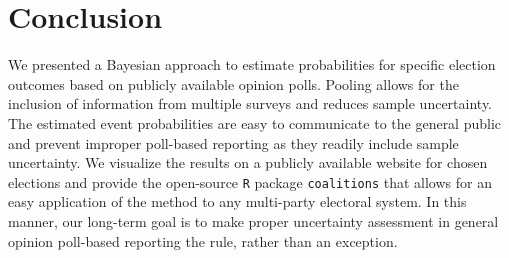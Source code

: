 \documentclass[smallcondensed]{svjour3}     %
\begin{document}
\section{Conclusion} \label{sec:conclusion}
We presented a Bayesian approach to estimate probabilities for specific election outcomes based on
publicly available opinion polls. Pooling allows for the inclusion of information from multiple
surveys and reduces sample uncertainty.
The estimated event probabilities are easy to communicate to the general public and prevent
improper poll-based reporting as they readily include sample uncertainty.
We visualize the results on a publicly available website for chosen elections and
provide the open-source \texttt{R} package \texttt{coalitions} that allows for an easy
application of the method to any multi-party electoral system.
In this manner, our long-term goal is to make proper uncertainty assessment
in general opinion poll-based reporting the rule, rather than an exception.



%
\end{document}
